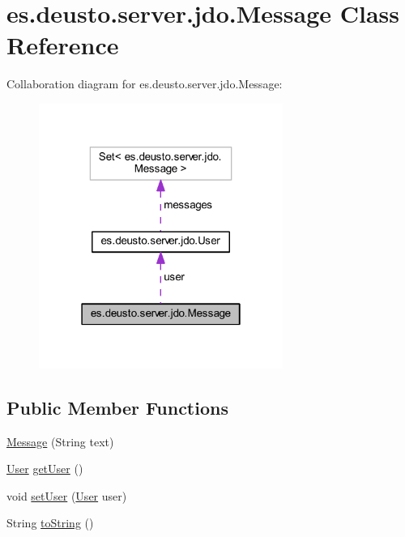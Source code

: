 \hypertarget{classes_1_1deusto_1_1server_1_1jdo_1_1_message}{}\section{es.\+deusto.\+server.\+jdo.\+Message Class Reference}
\label{classes_1_1deusto_1_1server_1_1jdo_1_1_message}


Collaboration diagram for es.\+deusto.\+server.\+jdo.\+Message\+:
\nopagebreak
\begin{figure}[H]
\begin{center}
\leavevmode
\includegraphics[width=226pt]{classes_1_1deusto_1_1server_1_1jdo_1_1_message__coll__graph}
\end{center}
\end{figure}
\subsection*{Public Member Functions}
\begin{DoxyCompactItemize}
\item 
\mbox{\hyperlink{classes_1_1deusto_1_1server_1_1jdo_1_1_message_ae3fb36faff2958657b6ba62ee6202499}{Message}} (String text)
\item 
\mbox{\hyperlink{classes_1_1deusto_1_1server_1_1jdo_1_1_user}{User}} \mbox{\hyperlink{classes_1_1deusto_1_1server_1_1jdo_1_1_message_a927dc699f38b0c9cdc59620da7a5f7f2}{get\+User}} ()
\item 
void \mbox{\hyperlink{classes_1_1deusto_1_1server_1_1jdo_1_1_message_aa14eb8300d45fc649c72410f2695fbfd}{set\+User}} (\mbox{\hyperlink{classes_1_1deusto_1_1server_1_1jdo_1_1_user}{User}} user)
\item 
String \mbox{\hyperlink{classes_1_1deusto_1_1server_1_1jdo_1_1_message_adb83e70d5da34c39954e6d7d418aa386}{to\+String}} ()
\end{DoxyCompactItemize}



